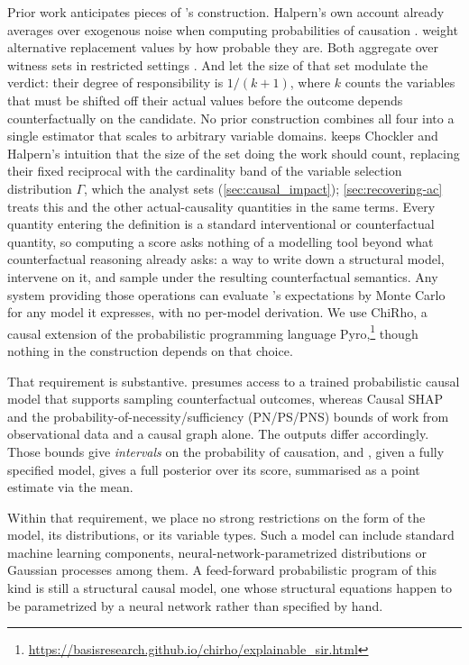 Prior work anticipates pieces of \ourapproach's construction. Halpern's own account
already averages over exogenous noise when computing probabilities of causation
\citep{actualCausalityHalpern}. \citet{Beckers2015CombiningPC} weight alternative
replacement values by how probable they are. Both aggregate over witness sets in
restricted settings \citep{Beckers2015CombiningPC, actualCausalityHalpern}. And
\citet{chocklerResponsibilityBlameStructuralModel2004} let the size of that set
modulate the verdict: their degree of responsibility is $1/(k{+}1)$, where $k$ counts
the variables that must be shifted off their actual values before the outcome depends
counterfactually on the candidate. No prior construction combines all four into a
single estimator that scales to arbitrary variable domains. \ourapproach keeps
Chockler and Halpern's intuition that the size of the set doing the work should count,
replacing their fixed reciprocal with the cardinality band of the variable selection
distribution $\Gamma$, which the analyst sets (\cref{sec:causal_impact});
\cref{sec:recovering-ac} treats this and the other actual-causality quantities in the
same terms.
Every quantity entering the \Ourapproach definition is a standard interventional or
counterfactual quantity, so computing a score asks nothing of a modelling tool beyond
what counterfactual reasoning already asks: a way to write down a structural model,
intervene on it, and sample under the resulting counterfactual semantics. Any system
providing those operations can evaluate \Ourapproach's expectations by Monte Carlo for
any model it expresses, with no per-model derivation. We use ChiRho, a causal extension
of the probabilistic programming language Pyro,\footnote{\url{https://basisresearch.github.io/chirho/explainable_sir.html}}
though nothing in the construction depends on that choice.

That requirement is substantive. \ourapproach presumes access to a trained
probabilistic causal model that supports sampling counterfactual outcomes, whereas
Causal SHAP and the probability-of-necessity/sufficiency (PN/PS/PNS) bounds of
\citet{muellerpearl2022causes} work from observational data and a causal graph alone.
The outputs differ accordingly. Those bounds give \emph{intervals} on the probability
of causation, and \ourapproach, given a fully specified model, gives a full posterior
over its score, summarised as a point estimate via the mean.

Within that requirement, we place no strong restrictions on the form of the model, its
distributions, or its variable types. Such a model can include standard machine
learning components, neural-network-parametrized distributions or Gaussian processes
among them. A feed-forward probabilistic program of this kind is still a structural
causal model, one whose structural equations happen to be parametrized by a neural
network rather than specified by hand.

